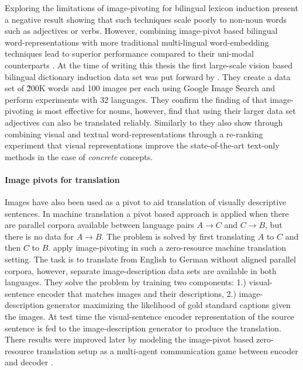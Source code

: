 Exploring the limitations of image-pivoting for bilingual lexicon induction
\cite{hartmann2017limitations} present a negative result
showing that such techniques scale poorly to non-noun words such as
adjectives or verbs. However, combining image-pivot based bilingual
word-representations with more traditional multi-lingual word-embedding
techniques lead to superior performance compared to their uni-modal
counterparts \cite{vulic2016multi}. At the time of writing this thesis
the first large-scale vision based bilingual dictionary induction data set
was put forward by \citep{hewitt2018learning}. They create a data set
of \~200K words and 100 images per each using Google Image Search and perform
experiments with 32 languages.
They confirm the finding of \cite{hartmann2017limitations} that image-pivoting
is most effective for nouns, however, find that using their larger data set
adjectives can also be translated reliably. Similarly to \cite{vulic2016multi}
they also show through combining
visual and textual word-representations through a re-ranking
experiment that visual representations improve the state-of-the-art
text-only methods in the case of \emph{concrete} concepts.

\paragraph{Image pivots for translation}
Images have also been used as a pivot to aid translation of visually
descriptive sentences. In machine translation a pivot based approach is applied
when there are parallel corpora available between language pairs $A\rightarrow C$
and $C \rightarrow B$, but there is no data for $A\rightarrow B$. The problem is
solved by first translating $A$ to $C$ and then $C$ to $B$.
\cite{nakayama2017zero} apply image-pivoting in such a zero-resource machine
translation setting. The task is to translate from English to German without
aligned parallel corpora, however, separate image-description data sets are
available in both languages. They solve the problem by
training two components: 1.) visual-sentence encoder that matches images and their descriptions,
2.) image-description generator maximizing the likelihood of gold standard captions given the images.
At test time the visual-sentence encoder representation of the source sentence is fed to the
image-description generator to produce the translation.
There results were improved later by modeling
the image-pivot based zero-resource translation setup as a
multi-agent communication game between encoder and decoder
\citep{chen2018zero,lee2017emergent}.


